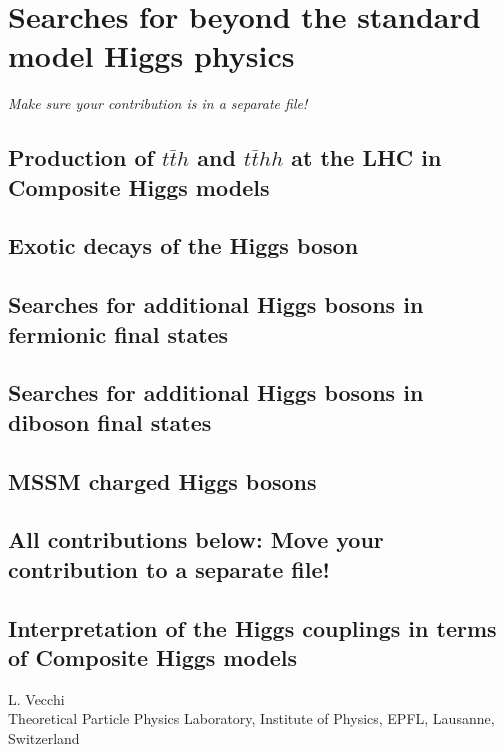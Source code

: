 \documentclass[../report.tex]{subfiles}
\providecommand{\main}{..}
\begin{document}
\section{Searches for beyond the standard model Higgs physics}

\emph{Make sure your contribution is in a separate file!}



\subsection{Production of $t\bar{t}h$ and $t\bar{t}h h$ at the LHC in Composite Higgs models}


\subsection{Exotic decays of the Higgs boson}




\subsection{Searches for additional Higgs bosons in fermionic final states}




\subsection{Searches for additional Higgs bosons in diboson final states}


\subsection{MSSM charged Higgs bosons}


\clearpage

\vspace{5cm}
\subsection{All contributions below: Move your contribution to a separate file!}




\subsection{Interpretation of the Higgs couplings in terms of Composite Higgs models}
\label{sec9:CHM}
\begin{center}
 {L. Vecchi\\
}
 {\small Theoretical Particle Physics Laboratory, Institute of Physics, EPFL, Lausanne, Switzerland}
\end{center}
\end{document}
